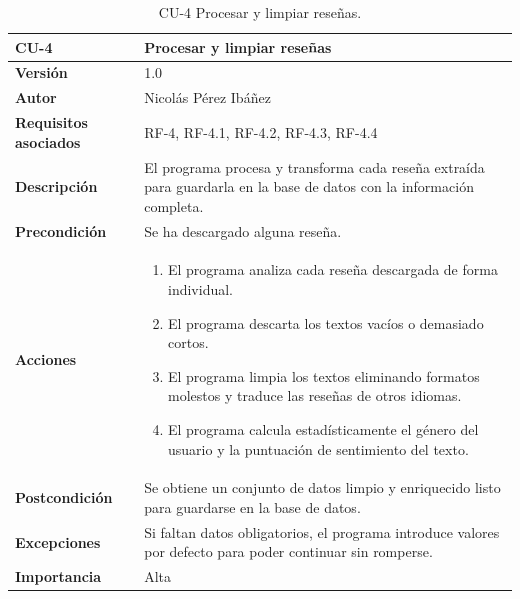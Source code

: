 \begin{table}[p]
	\centering
	\begin{tabularx}{\linewidth}{ p{} p{} }
		\toprule
		\textbf{CU-4}    & \textbf{Procesar y limpiar reseñas}\\
		\toprule
		\textbf{Versión}              & 1.0    \\
		\textbf{Autor}                & Nicolás Pérez Ibáñez \\
		\textbf{Requisitos asociados} & RF-4, RF-4.1, RF-4.2, RF-4.3, RF-4.4 \\
		\textbf{Descripción}          & El programa procesa y transforma cada reseña extraída para guardarla en la base de datos con la información completa. \\
		\textbf{Precondición}         & Se ha descargado alguna reseña. \\
		\textbf{Acciones}             &
		\begin{enumerate}
			\def\labelenumi{\arabic{enumi}.}
			\tightlist
			\item El programa analiza cada reseña descargada de forma individual.
			\item El programa descarta los textos vacíos o demasiado cortos.
			\item El programa limpia los textos eliminando formatos molestos y traduce las reseñas de otros idiomas.
			\item El programa calcula estadísticamente el género del usuario y la puntuación de sentimiento del texto.
		\end{enumerate}\\
		\textbf{Postcondición}        & Se obtiene un conjunto de datos limpio y enriquecido listo para guardarse en la base de datos. \\
		\textbf{Excepciones}          & Si faltan datos obligatorios, el programa introduce valores por defecto para poder continuar sin romperse. \\
		\textbf{Importancia}          & Alta \\
		\bottomrule
	\end{tabularx}
	\caption{CU-4 Procesar y limpiar reseñas.}
\end{table}

